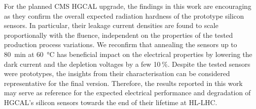 For the planned CMS HGCAL upgrade, the findings in this work are encouraging as they confirm the overall expected radiation hardness of the prototype silicon sensors.
In particular, their leakage current densities are found to scale proportionally with the fluence, independent on the properties of the tested production process variations.
We reconfirm that annealing the sensors up to \SI{80}{\minute} at \SI{60}{\celsius} has beneficial impact on the electrical properties by lowering the dark current and the depletion voltages by a few 10$~\%$.
Despite the tested sensors were prototypes, the insights from their characterisation can be considered representative for the final version.
Therefore, the results reported in this work may serve as reference for the expected electrical performance and degradation of HGCAL's silicon sensors towards the end of their lifetime at HL-LHC.